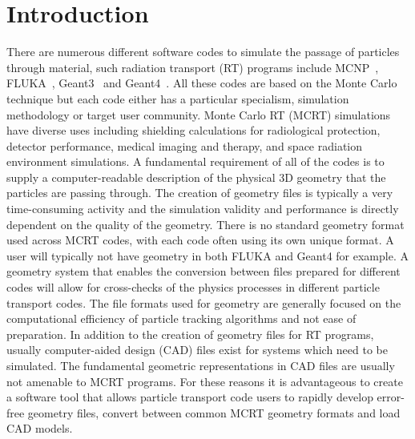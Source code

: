 \documentclass[final,5p,times,twocolumn]{elsarticle}
\begin{document}
\begin{small}

\end{small}

\section{Introduction} \label{sec:introduction}
There are numerous different software codes to simulate the passage of particles through material, such radiation transport (RT) programs
include MCNP~\cite{Mcnp_Werner}, FLUKA~\cite{Fluka_Ferrari,Fluka_Bohlen}, Geant3~\cite{Geant3_Brun} and Geant4~\cite{Geant4_Agostinelli}.
All these codes are based on the Monte Carlo technique but each code either has a particular specialism, simulation methodology or target user community.
 Monte Carlo RT (MCRT) simulations have diverse uses including shielding calculations for radiological protection, detector performance, medical
imaging and therapy, and space radiation environment simulations. A fundamental requirement of all of the codes is to supply a
computer-readable description of the  physical 3D geometry that  the particles are passing through.  The creation of geometry files is
typically a very time-consuming activity and the simulation validity and performance is directly dependent on the quality of the geometry. There is no
standard geometry format used across MCRT codes, with each code often using its own unique format. A user will typically not have geometry in both FLUKA and Geant4 for example. A geometry system
that enables the conversion between files prepared for different codes will allow for cross-checks of the physics processes in different particle transport
 codes.  The file formats used for geometry are generally focused
 on the computational efficiency of particle tracking algorithms  and not ease of preparation. In addition to the creation of geometry files for RT programs, usually
 computer-aided design (CAD) files exist for systems which need to be simulated. The fundamental geometric representations in CAD files are usually not
 amenable to MCRT programs.  For these reasons it is advantageous to create a software tool that allows particle transport code users to rapidly develop
 error-free geometry files, convert between common MCRT geometry formats and load CAD models.
\end{document}
